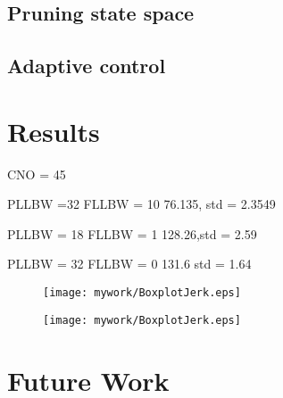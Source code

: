 \subsection{Pruning state space}

\subsection{Adaptive control}

\section{Results}


CNO = 45

PLLBW =32
FLLBW = 10
76.135, std = 2.3549

PLLBW = 18
FLLBW = 1
128.26,std =  2.59 

PLLBW = 32
FLLBW = 0
131.6 std = 1.64

\begin{figure}[!htb] 
    \centering
    \texttt{[image: mywork/BoxplotJerk.eps]} 
    \caption{}
    \label{fig:BoxplotJerk}
\end{figure}


\begin{figure}[!htb] 
    \centering
    \texttt{[image: mywork/BoxplotJerk.eps]} 
    \caption{}
    \label{fig:BoxplotPhaseJitter}
\end{figure}



\section{Future Work}
